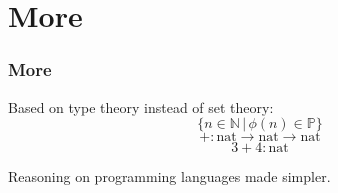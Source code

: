 \section{More}
\begin{frame}
  \frametitle{More}
  Based on type theory instead of set theory:
  \[
    \{ n \in \mathbb{N}\,|\, \phi(n) \in \mathbb{P}\}
  \]
  \[
    + : \mathrm{nat} \rightarrow \mathrm{nat} \rightarrow \mathrm{nat}
  \]
  \[
    3 + 4 : \mathrm{nat}
  \]

  Reasoning on programming languages made simpler.
\end{frame}



